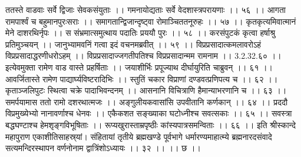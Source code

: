 ततस्ते वाडवाः सर्वे द्विजाः सेवकसंयुताः ।।
गमनायोद्यताः सर्वे वेदशास्त्रपरायणाः ।। ५६ ।।
आगता रामपार्श्वं च बहुमानपुरःसराः ।।
समागतान्द्विजान्दृष्ट्वा रोमाञ्चिततनूरुहः ।। ५७ ।।
कृतकृत्यमिवात्मानं मेने दाशरथिर्नृपः ।।
स संभ्रमात्समुत्थाय पदातिः प्रययौ पुरः ।। ५८ ।।
करसंपुटकं कृत्वा हर्षाश्रु प्रतिमुञ्चयन् ।।
जानुभ्यामवनिं गत्वा इदं वचनमब्रवीत् ।। ५९ ।।
विप्रप्रसादात्कमलावरोऽहं विप्रप्रसादाद्धरणीधरोऽहम् ।।
विप्रप्रसादाज्जगतीपतिश्च विप्रप्रसादान्मम रामनाम ।। 3.2.32.६० ।।
इत्येवमुक्ता रामेण वाड वास्ते प्रहर्षिताः ।।
जयाशीर्भिः प्रपूज्याथ दीर्घायुरिति चाब्रुवन् ।। ६१ ।।
आवर्जितास्ते रामेण पाद्यार्घ्यविष्टरादिभिः ।।
स्तुतिं चकार विप्राणां दण्डवत्प्रणिपत्य च ।। ६२ ।।
कृताञ्जलिपुटः स्थित्वा चक्रे पादाभिवन्दनम् ।।
आसनानि विचित्राणि हैमान्याभरणानि च ।। ६३ ।।
समर्पयामास ततो रामो दशरथात्मजः ।।
अङ्गुलीयकवासांसि उपवीतानि कर्णकान् ।। ६४ ।।
प्रददौ विप्रमुख्येभ्यो नानावर्णाश्च धेनवः ।।
एकैकशत सङ्ख्याका घटोध्नीश्च सवत्सकाः ।। ६५ ।।
सवस्त्रा बद्धघण्टाश्च हेमशृङ्गविभूषिताः ।।
रूप्यखुरास्ताम्रपृष्ठीः कांस्यपात्रसमन्विताः ।। ६६ ।।
इति श्रीस्कान्दे महापुराण एकाशीतिसाहस्र्यां। संहितायां तृतीये ब्रह्मखण्डे पूर्वभागे धर्मारण्यमाहात्म्ये ब्रह्मनारदसंवादे सत्यमन्दिरस्थापन वर्णनोनाम द्वात्रिंशोऽध्यायः ।। ३२ ।। ।। छ ।।

